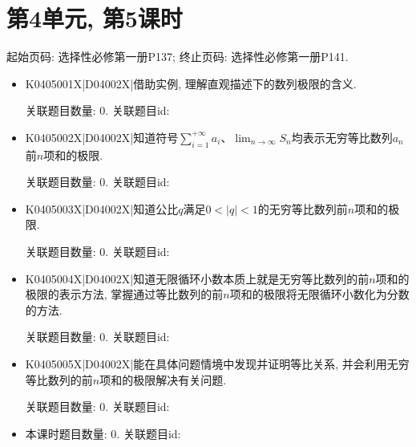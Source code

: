 \section*{第4单元, 第5课时}
起始页码: 选择性必修第一册P137; 终止页码: 选择性必修第一册P141.
\begin{itemize}
\item K0405001X|D04002X|借助实例, 理解直观描述下的数列极限的含义.

关联题目数量: 0. 关联题目id: 

\item K0405002X|D04002X|知道符号$\sum\limits_{i=1}^{+\infty }{a_i}$、$\displaystyle\lim_{n\to \infty}S_n$均表示无穷等比数列${a_n}$前$n$项和的极限.

关联题目数量: 0. 关联题目id: 

\item K0405003X|D04002X|知道公比$q$满足$0<|q|<1$的无穷等比数列前$n$项和的极限.

关联题目数量: 0. 关联题目id: 

\item K0405004X|D04002X|知道无限循环小数本质上就是无穷等比数列的前$n$项和的极限的表示方法, 掌握通过等比数列的前$n$项和的极限将无限循环小数化为分数的方法.

关联题目数量: 0. 关联题目id: 

\item K0405005X|D04002X|能在具体问题情境中发现并证明等比关系, 并会利用无穷等比数列的前$n$项和的极限解决有关问题.

关联题目数量: 0. 关联题目id: 

\item 本课时题目数量: 0. 关联题目id: 

\end{itemize}

